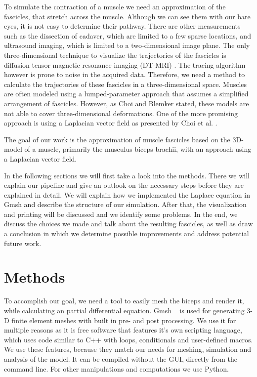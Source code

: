 \documentclass[preprint,journal]{vgtc}       %
\begin{document}
To simulate the contraction of a muscle we need an approximation of the fascicles, that stretch across the muscle. 
Although we can see them with our bare eyes, it is not easy to determine their pathway. 
There are other measurements such as the dissection of cadaver, which are limited to a few sparse locations, and ultrasound imaging, which is limited to a two-dimensional image plane.
The only three-dimensional technique to visualize the trajectories of the fascicles is diffusion tensor magnetic resonance imaging (DT-MRI) \cite{Choi2013}.
The tracing algorithm however is prone to noise in the acquired data.
Therefore, we need a method to calculate the trajectories of these fascicles in a three-dimensional space.
Muscles are often modeled using a lumped-parameter approach that assumes a simplified arrangement of fascicles. 
However, as Choi and Blemker \cite{Choi2013} stated, these models are not able to cover three-dimensional deformations.
One of the more promising approach is using a Laplacian vector field as presented by Choi et al. \cite{Choi2013}. 

The goal of our work is the approximation of muscle fascicles based on the 3D-model of a muscle, primarily the musculus biceps brachii, with an approach using a Laplacian vector field. 

In the following sections we will first take a look into the methods. 
There we will explain our pipeline and give an outlook on the necessary steps before they are explained in detail. 
We will explain how we implemented the Laplace equation in Gmsh and describe the structure of our simulation. 
After that, the visualization and printing will be discussed and we identify some problems. 
In the end, we discuss the choices we made and talk about the resulting fascicles, as well as draw a conclusion in which we determine possible improvements and address potential future work.

%
%
%
\section{Methods}

To accomplish our goal, we need a tool to easily mesh the biceps and render it, while calculating an partial differential equation. 
Gmsh ~\cite{Geuzaine2009} is used for generating 3-D finite element meshes with built in pre- and post processing. 
We use it for multiple reasons as it is free software that features it's own scripting language, which uses code similar to C++ with loops, conditionals and user-defined macros.
We use these features, because they match our needs for meshing, simulation and analysis of the model. 
It can be compiled without the GUI, directly from the command line. 
For other manipulations and computations we use Python.
\end{document}
